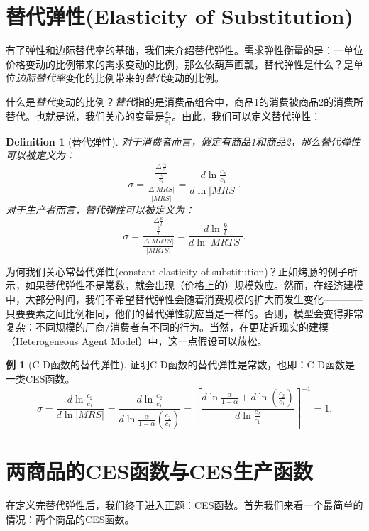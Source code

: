 \documentclass[UTF8]{ctexart}
\newtheorem{definition}{Definition}[section]
\theoremstyle{definition}
\newtheorem{example}{\kaishu 例}[section]
\begin{document}
\section{替代弹性(Elasticity of Substitution)}
有了弹性和边际替代率的基础，我们来介绍替代弹性。需求弹性衡量的是：一单位价格变动的比例带来的需求变动的比例，那么依葫芦画瓢，替代弹性是什么？是单位\textit{边际替代率}变化的比例带来的\textit{替代}变动的比例。

什么是\textit{替代}变动的比例？\textit{替代}指的是消费品组合中，商品1的消费被商品2的消费所替代。也就是说，我们关心的变量是$\frac{c_2}{c_1}$。由此，我们可以定义替代弹性：
\begin{definition}[替代弹性]
对于消费者而言，假定有商品1和商品2，那么替代弹性可以被定义为：
\[\sigma=\frac{\frac{\Delta\frac{c_2}{c_1}}{\frac{c_2}{c_1}}}{\frac{\Delta |MRS|}{|MRS|}}=\frac{d\ln \frac{c_2}{c_1}}{d\ln |MRS|}.\]
对于生产者而言，替代弹性可以被定义为：
\[\sigma=\frac{\frac{\Delta\frac{k}{l}}{\frac{k}{l}}}{\frac{\Delta |MRTS|}{|MRTS|}}=\frac{d\ln \frac{k}{l}}{d\ln |MRTS|}.\]
\end{definition}
为何我们关心常替代弹性(constant elasticity of substitution)？正如烤肠的例子所示，如果替代弹性不是常数，就会出现（价格上的）规模效应。然而，在经济建模中，大部分时间，我们不希望替代弹性会随着消费规模的扩大而发生变化————只要要素之间比例相同，他们的替代弹性就应当是一样的。否则，模型会变得非常复杂：不同规模的厂商/消费者有不同的行为。当然，在更贴近现实的建模（Heterogeneous Agent Model）中，这一点假设可以放松。

\begin{example}[C-D函数的替代弹性]
\kaishu 证明C-D函数的替代弹性是常数，也即：C-D函数是一类CES函数。
\[\sigma=\frac{d\ln \frac{c_2}{c_1}}{d\ln |MRS|}=\frac{d\ln \frac{c_2}{c_1}}{d\ln\frac{\alpha}{1-\alpha}(\frac{c_2}{c_1})}=\left[\frac{d\ln\frac{\alpha}{1-\alpha}+d\ln(\frac{c_2}{c_1})}{d\ln \frac{c_2}{c_1}}\right]^{-1}=1.\]
\end{example}

\section{两商品的CES函数与CES生产函数}
在定义完替代弹性后，我们终于进入正题：CES函数。首先我们来看一个最简单的情况：两个商品的CES函数。
\end{document}

